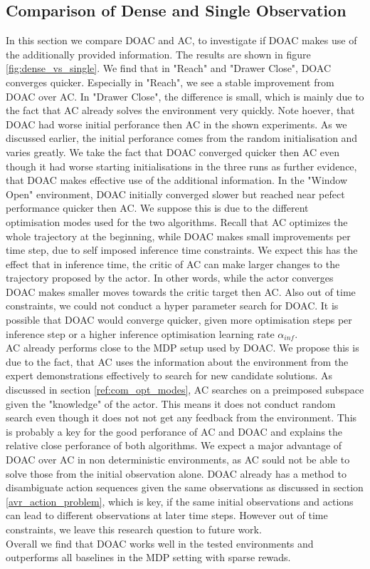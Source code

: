 \subsection{Comparison of Dense and Single Observation}
\label{sec:comp_dense_sparse}
In this section we compare DOAC and AC, to investigate if DOAC makes use of the additionally provided information. The results are shown in figure \ref{fig:dense_vs_single}.
We find that in "Reach" and "Drawer Close", DOAC converges quicker. Especially in "Reach", we see a stable improvement from DOAC over AC. In "Drawer Close", the difference is 
small, which is mainly due to the fact that AC already solves the environment very quickly. Note hoever, that DOAC had worse initial perforance then AC in the shown experiments. 
As we discussed earlier, the initial perforance comes from the random initialisation and varies greatly. We take the fact that DOAC converged quicker then AC even though it had 
worse starting initialisations in the three runs as further evidence, that DOAC makes effective use of the additional information. In the "Window Open" environment, DOAC initially converged slower but 
reached near pefect performance quicker then AC. We suppose this is due to the different optimisation modes used for the two algorithms. Recall that AC optimizes the whole 
trajectory at the beginning, while DOAC makes small improvements per time step, due to self imposed inference time constraints. We expect this has the effect that in inference time, the critic of 
AC can make larger changes to the trajectory proposed by the actor. In other words, while the actor converges DOAC makes smaller moves towards the critic target then AC. Also out of time constraints, we could 
not conduct a hyper parameter search for DOAC. It is possible that DOAC would converge quicker, given more optimisation steps per inference step or a higher inference optimisation 
learning rate $\alpha_{inf}$.\\ 
AC already performs close to the MDP setup used by DOAC. We propose this is due to the fact, that AC uses the information about the environment 
from the expert demonstrations effectively to search for new candidate solutions. As discussed in section \ref{ref:com_opt_modes}, AC searches on a preimposed subspace given the "knowledge" of the 
actor. This means it does not conduct random search even though it does not not get any feedback from the environment. This is probably a key for the good perforance of AC and DOAC and explains 
the relative close perforance of both algorithms. We expect a major advantage of DOAC over AC in non deterministic environments, as AC sould not be able to solve those from the initial 
observation alone. DOAC already has a method to disambiguate action sequences given the same observations as discussed in section \ref{avr_action_problem}, which is key, if the same initial 
observations and actions can lead to different observations at later time steps. However out of time constraints, we leave this research question to future work.\\
Overall we find that DOAC works well in the tested environments and outperforms all baselines in the MDP setting with sparse rewads.

